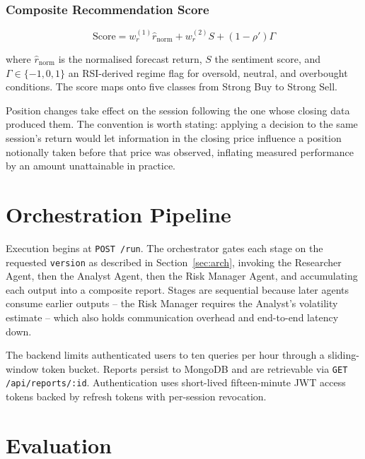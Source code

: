 \documentclass[conference]{IEEEtran}
\begin{document}
\subsubsection{Composite Recommendation Score}

\begin{equation}
\label{eq:final}
\mathrm{Score} = w_r^{(1)} \hat{r}_{\mathrm{norm}} + w_r^{(2)} S + (1-\rho')\Gamma
\end{equation}

where $\hat{r}_{\mathrm{norm}}$ is the normalised forecast return, $S$ the sentiment score, and $\Gamma \in \{-1,0,1\}$ an RSI-derived regime flag for oversold, neutral, and overbought conditions. The score maps onto five classes from Strong Buy to Strong Sell.

Position changes take effect on the session following the one whose closing data produced them. The convention is worth stating: applying a decision to the same session's return would let information in the closing price influence a position notionally taken before that price was observed, inflating measured performance by an amount unattainable in practice.

\section{Orchestration Pipeline}
\label{sec:pipeline}

Execution begins at \texttt{POST /run}. The orchestrator gates each stage on the requested \texttt{version} as described in Section~\ref{sec:arch}, invoking the Researcher Agent, then the Analyst Agent, then the Risk Manager Agent, and accumulating each output into a composite report. Stages are sequential because later agents consume earlier outputs -- the Risk Manager requires the Analyst's volatility estimate -- which also holds communication overhead and end-to-end latency down.

The backend limits authenticated users to ten queries per hour through a sliding-window token bucket. Reports persist to MongoDB and are retrievable via \texttt{GET /api/reports/:id}. Authentication uses short-lived fifteen-minute JWT access tokens backed by refresh tokens with per-session revocation.

\section{Evaluation}
\label{sec:evaluation}
\end{document}
